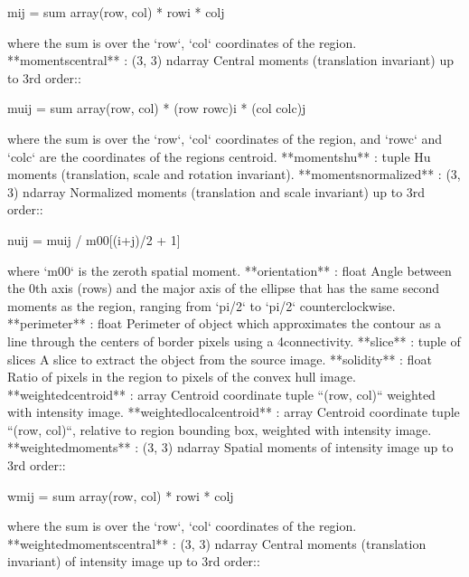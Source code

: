 \documentclass[letterpaper,10pt,english]{sphinxmanual}
\begin{document}
\begin{sphinxVerbatim}[commandchars=\\\{\}]
            m\PYGZus{}ij = sum\PYGZob{} array(row, col) * row\PYGZca{}i * col\PYGZca{}j \PYGZcb{}
    
        where the sum is over the `row`, `col` coordinates of the region.
    **moments\PYGZus{}central** : (3, 3) ndarray
        Central moments (translation invariant) up to 3rd order::
    
            mu\PYGZus{}ij = sum\PYGZob{} array(row, col) * (row \PYGZhy{} row\PYGZus{}c)\PYGZca{}i * (col \PYGZhy{} col\PYGZus{}c)\PYGZca{}j \PYGZcb{}
    
        where the sum is over the `row`, `col` coordinates of the region,
        and `row\PYGZus{}c` and `col\PYGZus{}c` are the coordinates of the region\PYGZsq{}s centroid.
    **moments\PYGZus{}hu** : tuple
        Hu moments (translation, scale and rotation invariant).
    **moments\PYGZus{}normalized** : (3, 3) ndarray
        Normalized moments (translation and scale invariant) up to 3rd order::
    
            nu\PYGZus{}ij = mu\PYGZus{}ij / m\PYGZus{}00\PYGZca{}[(i+j)/2 + 1]
    
        where `m\PYGZus{}00` is the zeroth spatial moment.
    **orientation** : float
        Angle between the 0th axis (rows) and the major
        axis of the ellipse that has the same second moments as the region,
        ranging from `\PYGZhy{}pi/2` to `pi/2` counter\PYGZhy{}clockwise.
    **perimeter** : float
        Perimeter of object which approximates the contour as a line
        through the centers of border pixels using a 4\PYGZhy{}connectivity.
    **slice** : tuple of slices
        A slice to extract the object from the source image.
    **solidity** : float
        Ratio of pixels in the region to pixels of the convex hull image.
    **weighted\PYGZus{}centroid** : array
        Centroid coordinate tuple ``(row, col)`` weighted with intensity
        image.
    **weighted\PYGZus{}local\PYGZus{}centroid** : array
        Centroid coordinate tuple ``(row, col)``, relative to region bounding
        box, weighted with intensity image.
    **weighted\PYGZus{}moments** : (3, 3) ndarray
        Spatial moments of intensity image up to 3rd order::
    
            wm\PYGZus{}ij = sum\PYGZob{} array(row, col) * row\PYGZca{}i * col\PYGZca{}j \PYGZcb{}
    
        where the sum is over the `row`, `col` coordinates of the region.
    **weighted\PYGZus{}moments\PYGZus{}central** : (3, 3) ndarray
        Central moments (translation invariant) of intensity image up to
        3rd order::
    

\end{sphinxVerbatim}
\end{document}
